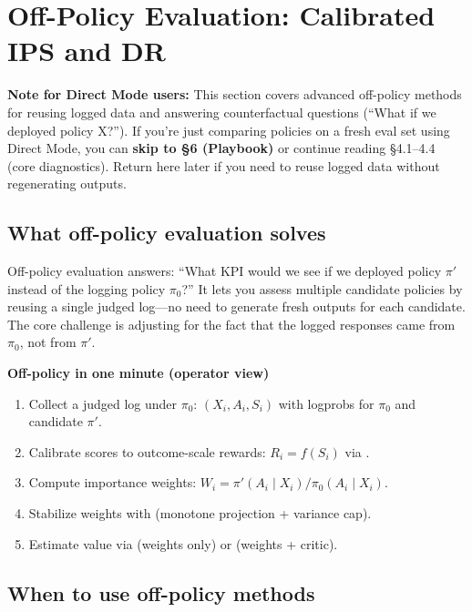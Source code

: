 \section{Off-Policy Evaluation: Calibrated IPS and DR}

\begin{mdframed}[linecolor=cjegray, backgroundcolor=white, linewidth=1pt]
\textbf{Note for Direct Mode users:} This section covers advanced off-policy methods for reusing logged data and answering counterfactual questions (``What if we deployed policy X?''). If you're just comparing policies on a fresh eval set using Direct Mode, you can \textbf{skip to §6 (Playbook)} or continue reading §4.1--4.4 (core diagnostics). Return here later if you need to reuse logged data without regenerating outputs.
\end{mdframed}

\subsection{What off-policy evaluation solves}

Off-policy evaluation answers: ``What KPI would we see if we deployed policy $\pi'$ instead of the logging policy $\pi_0$?'' It lets you assess multiple candidate policies by reusing a single judged log---no need to generate fresh outputs for each candidate. The core challenge is adjusting for the fact that the logged responses came from $\pi_0$, not from $\pi'$.

\begin{quickref}
\textbf{Off-policy in one minute (operator view)}
\begin{enumerate}
\item Collect a judged log under $\pi_0$: $(X_i, A_i, S_i)$ with logprobs for $\pi_0$ and candidate $\pi'$.
\item Calibrate scores to outcome-scale rewards: $R_i = f(S_i)$ via \autocal.
\item Compute importance weights: $W_i = \pi'(A_i \mid X_i) / \pi_0(A_i \mid X_i)$.
\item Stabilize weights with \simcal{} (monotone projection + variance cap).
\item Estimate value via \ips{} (weights only) or \dr{} (weights + critic).
\end{enumerate}
\end{quickref}

\subsection{When to use off-policy methods}


